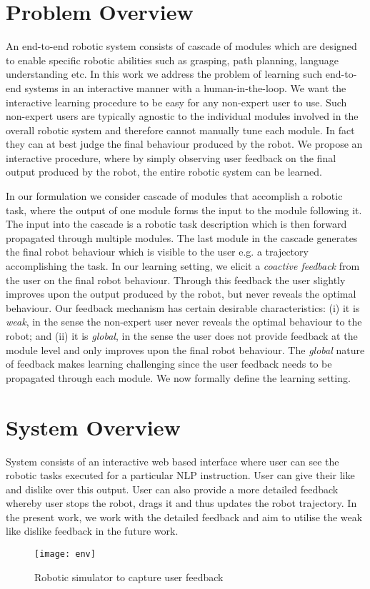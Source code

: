 \section{Problem Overview}

An end-to-end robotic system consists of cascade of modules which are designed to enable specific robotic abilities such as grasping, path planning, language understanding etc. In this
work we address the problem of learning such end-to-end systems in an interactive manner with a human-in-the-loop. We want the interactive learning procedure to be easy for any non-expert user to use. Such non-expert users are typically agnostic to the individual modules involved in the overall robotic system and therefore cannot manually tune each module. In fact they can at best judge the final behaviour produced by the robot. We propose an interactive procedure, where by simply observing user feedback on the final output produced by the robot, the entire robotic system can be learned.

In our formulation we consider cascade of modules that accomplish a robotic task, where the output of one module forms the input to the module following it. The input into the cascade is a robotic task description which is then forward propagated through multiple modules. The last module in the cascade generates the final robot behaviour which is visible to the user e.g. a trajectory accomplishing the task. In our learning setting, we elicit a \textit{coactive feedback} from the user on the final robot behaviour. Through this feedback the user slightly improves upon the output produced by the robot, but never reveals the optimal behaviour. Our feedback mechanism has certain desirable characteristics: (i) it is \textit{weak}, in the sense the non-expert user never reveals the optimal behaviour to the robot; and (ii) it is \textit{global}, in the sense the user does not provide feedback at the module level and only improves upon the final robot behaviour. The \textit{global} nature of feedback makes learning challenging since the user feedback needs to be propagated through each module. We now formally define the learning setting.

\section{System Overview}
System consists of an interactive web based interface where user can see the robotic tasks
executed for a particular NLP instruction. User can give their like and dislike
over this output. User can also provide a more detailed feedback whereby user stops the robot, drags it and thus updates the robot trajectory. In the present work, we work with the detailed feedback and aim to utilise the weak like dislike feedback in the future work.

\begin{figure}[h]
\texttt{[image: env]}
\centering
\caption{Robotic simulator to capture user feedback}
	\label{fig:env}
\end{figure}
